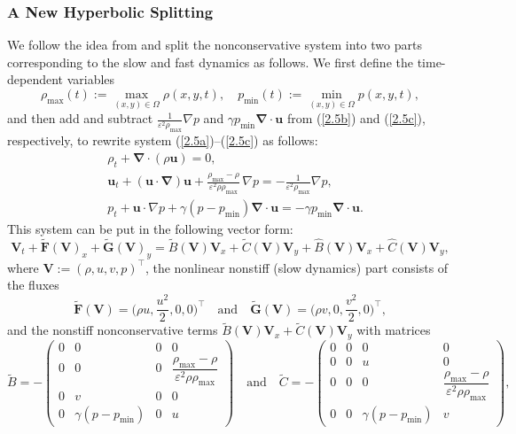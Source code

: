 \documentclass[preprint,12pt]{elsarticle}
\def\bnabla{\bm{\nabla}}
\newcommand{\mF}{\bm{F}}
\newcommand{\mG}{\bm{G}}
\newcommand{\ve}{\varepsilon}
\newcommand\eref[1]{(\ref{#1})}
\begin{document}
\subsubsection{A New Hyperbolic Splitting}
We follow the idea from \cite{haack2012all,LCK} and split the nonconservative system into two parts corresponding to the slow and fast
dynamics as follows. We first define the time-dependent variables 
\begin{equation}
	\rho_{\max}(t):=\max\limits_{(x,y)\in\Omega}\rho(x,y,t),\quad p_{\min}(t):=\min\limits_{(x,y)\in\Omega}p(x,y,t),
	\label{4.3}
\end{equation}
and then add and subtract $\frac{1}{\ve^2\rho_{\max}}\nabla p$ and $\gamma p_{\min}\bnabla\cdot\bm u$ from \eref{2.5b} and \eref{2.5c},
respectively, to rewrite system \eref{2.5a}--\eref{2.5c} as follows:
\begin{align}
	&\rho_t+\bnabla\!\cdot\!(\rho\bm u)=0,\label{2.1}\\
	&\bm u_t+(\bm u\!\cdot\!\bnabla)\bm u+\frac{\rho_{\max}-\rho}{\ve^2\rho\rho_{\max}}\,\nabla p=-\frac{1}{\ve^2\rho_{\max}}
	\nabla p,\label{2.2}\\[0.5ex]
	&p_t+\bm u\!\cdot\!\nabla p+\gamma(p-p_{\min})\bnabla\!\cdot\!\bm u=-\gamma p_{\min}\bnabla\!\cdot\!\bm u.\label{2.3}
\end{align}
This system can be put in the following vector form:
\begin{equation}
	\bm V_t+\widetilde{\mF}(\bm V)_x+\widetilde{\mG}(\bm V)_y=\widetilde B(\bm V)\bm V_x+\widetilde C(\bm V)\bm V_y+\widehat B(\bm V)\bm V_x+
	\widehat C(\bm V)\bm V_y,
	\label{4.47}
\end{equation}
where $\bm V:=(\rho,u,v,p)^\top$, the nonlinear nonstiff (slow dynamics) part consists of the fluxes
\begin{equation*}
	\widetilde{\mF}(\bm V)=\Big(\rho u,\frac{u^2}{2},0,0\Big)^\top\quad\mbox{and}\quad
	\widetilde{\mG}(\bm V)=\Big(\rho v,0,\frac{v^2}{2},0\Big)^\top,
\end{equation*}
and the nonstiff nonconservative terms $\widetilde B(\bm V)\bm V_x+\widetilde C(\bm V)\bm V_y$ with matrices
\begin{equation*}
	\widetilde B=-\begin{pmatrix}0&0&0&0\\0&0&0&\dfrac{\rho_{\max}-\rho}{\ve^2\rho\rho_{\max}}\\0&v&0&0\\0&\gamma(p-p_{\min})&0&u\end{pmatrix}
	\quad\mbox{and}\quad
	\widetilde C=-\begin{pmatrix}0&0&0&0\\0&0&u&0\\0&0&0&\dfrac{\rho_{\max}-\rho}{\ve^2\rho\rho_{\max}}\\0&0&\gamma(p-p_{\min})&v\end{pmatrix},
\end{equation*}
\end{document}
